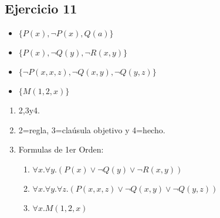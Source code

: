 \documentclass[10pt,a4paper]{article}
\begin{document}

\subsection{Ejercicio 11}

    \begin{itemize}
        \item $\{P(x), \lnot P(x), Q(a)\}$
        \item $\{P(x), \lnot Q(y), \lnot R(x,y) \}$
        \item $\{\lnot P(x,x,z), \lnot Q(x,y), \lnot Q(y,z) \}$
        \item $\{M(1,2,x) \}$
    \end{itemize}
    \begin{enumerate}
        \item 2,3y4.
        \item 2=regla, 3=claúsula objetivo y 4=hecho.
        \item Formulas de 1er Orden:
            \begin{enumerate}
                \item $\forall x. \forall y. (P(x) \lor \lnot Q(y) \lor \lnot R(x,y))$
                \item $\forall x. \forall y. \forall z. (P(x,x,z) \lor \lnot Q(x,y) \lor \lnot Q(y,z))$
                \item $\forall x. M(1,2,x)$
            \end{enumerate}
    \end{enumerate}
\end{document}
